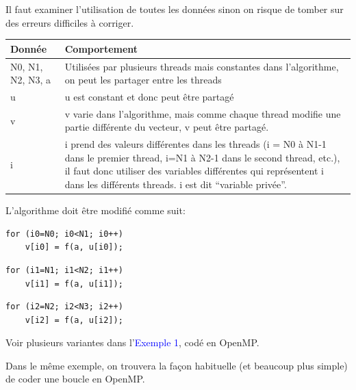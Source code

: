 \documentclass{beamer}
\begin{document}
\begin{frame}[fragile]
Il faut examiner l'utilisation de toutes les données sinon on risque de tomber sur des erreurs difficiles à corriger.

\vfill
\begin{tabular}{|l|l|}
	 \hline
	\bf Donnée & \bf Comportement \\
	 \hline
	 \begin{minipage}[t]{0.20\textwidth}
	 	N0, N1, N2, N3, a 
	\end{minipage}
 & \begin{minipage}[t]{0.78\textwidth}
	 	Utilisées par plusieurs threads mais constantes dans l'algorithme, on peut les partager entre les threads
 	\end{minipage}
 	 \\[25pt]
	 \hline
	 u &  \begin{minipage}[t]{0.75\textwidth}
	 	u est constant et donc peut être partagé\end{minipage}
	 \\[10pt]
	 \hline
	 v &  \begin{minipage}[t]{0.75\textwidth}
	 	v varie dans l'algorithme, mais comme chaque thread modifie une partie différente du vecteur, v peut être partagé.\end{minipage}
	 \\[20pt]
	 \hline
	 i &  \begin{minipage}[t]{0.75\textwidth}
	 	i prend des valeurs différentes dans les threads (i = N0 à N1-1 dans le premier thread, i=N1 à N2-1 dans le second thread, etc.), il faut donc utiliser des variables différentes qui représentent i dans les différents threads. i est dit ``variable privée''.\end{minipage}
	 \\[30pt]
	 \hline
\end{tabular}

\end{frame}

\begin{frame}[fragile]
	L'algorithme doit être modifié comme suit:
	
\begin{lstlisting}
for (i0=N0; i0<N1; i0++)
	v[i0] = f(a, u[i0]);
\end{lstlisting}

\begin{lstlisting}
for (i1=N1; i1<N2; i1++)
	v[i1] = f(a, u[i1]);
\end{lstlisting}

\begin{lstlisting}
for (i2=N2; i2<N3; i2++)
	v[i2] = f(a, u[i2]);
\end{lstlisting}
\vfill

Voir plusieurs variantes dans l'\textcolor{blue}{Exemple 1}, codé en OpenMP.

Dans le même exemple, on trouvera la façon habituelle (et beaucoup plus simple) de coder une boucle en OpenMP.
\end{frame}
\end{document}
